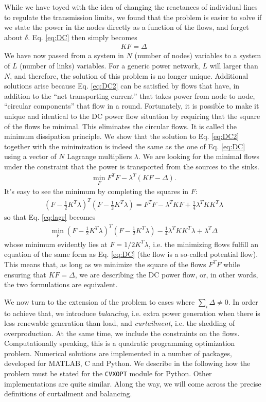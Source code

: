 \documentclass[english,twoside,a4paper,11pt]{article}
\numberwithin{equation}{section}
\begin{document}
While we have toyed with the idea of changing the reactances of
individual lines to regulate the transmission limits, we found that
the problem is easier to solve if we state the power in the nodes
directly as a function of the flows, and forget about
$\delta$. Eq. \eqref{eq:DC} then simply becomes
\begin{align}
KF= \Delta
\label{eq:DC2}
\end{align}
We have now passed from a system in $N$ (number of nodes) variables to
a system of $L$ (number of links) variables. For a generic power
network, $L$ will larger than $N$, and therefore, the solution of this
problem is no longer unique. Additional solutions arise because
Eq. \eqref{eq:DC2} can be satisfied by flows that have, in addition to
the ``net transporting current'' that takes power from node to node,
``circular components'' that flow in a round. Fortunately, it is
possible to make it unique and identical to the DC power flow
situation by requiring that the square of the flows be minimal. This
eliminates the circular flows. It is called the minimum dissipation
principle. We show that the solution
to Eq. \eqref{eq:DC2} together with the minimization is indeed the
same as the one of Eq. \eqref{eq:DC} using a vector of $N$ Lagrange
multipliers $\lambda$. We are looking for the minimal flows under the
constraint that the power is transported from the sources to the sinks.
\begin{align}
\min_F F^T F -\lambda^T (KF-\Delta).
\label{eq:lagr}
\end{align}
It's easy to see the minimum by completing the squares in $F:$
\begin{align*}
\left(F- \frac{1}{2}K^T \lambda\right)^T 
\left(F- \frac{1}{2}K^T \lambda\right)
=F^T F-\lambda^T KF+ \frac{1}{4}\lambda^T K K^T \lambda
\end{align*}
so that Eq. \eqref{eq:lagr} becomes
\begin{align*}
\min_F
\left(F- \frac{1}{2}K^T \lambda\right)^T 
\left(F- \frac{1}{2}K^T \lambda\right)-
\frac{1}{4}\lambda^T K K^T \lambda  +\lambda^T \Delta
\end{align*}
whose minimum evidently lies at $F=1/2 K^T \lambda$, i.e.
the minimizing flows fulfill an equation of the same form as
Eq. \eqref{eq:DC} (the flow is a so-called potential flow). This means
that, as long as we minimize the square 
of the flows $F^T F$ while ensuring that $KF= \Delta$, we are describing
the DC power flow, or, in other words, the two formulations are
equivalent.

We now turn to the extension of the problem to cases where $\sum_i
\Delta \neq 0$. In order to achieve that, we introduce {\it balancing},
i.e. extra power generation when there is less renewable generation
than load, and {\it curtailment}, i.e. the shedding of
overproduction. At the same time, we include the constraints
on the flows. Computationally speaking, this is a quadratic
programming optimization problem. Numerical solutions are implemented
in a number of packages, developed for MATLAB, C and Python. We
describe in the following how the problem must be stated for the
\texttt{CVXOPT} module for Python. Other implementations are quite
similar. Along the way, we will come across the precise definitions of
curtailment and balancing.
\end{document}
